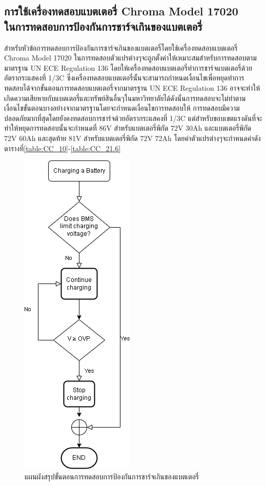\subsection{การใช้เครื่องทดสอบแบตเตอรี่ Chroma Model 17020 \\ ในการทดสอบการป้องกันการชาร์จเกินของแบตเตอรี่}
สำหรับหัวข้อการทดสอบการป้องกันการชาร์จเกินของแบตเตอรี่โดยใช้เครื่องทดสอบแบตเตอรี่ Chroma Model 17020 ในการทดสอบตัวแปรต่างๆจะถูกตั้งค่าให้เหมาะสมสำหรับการทดสอบตามมาตรฐาน UN ECE Regulation 136 โดยให้เครื่องทดสอบแบตเตอรี่ทำการชาร์จแบตเตอรี่ด้วยอัตรากระแสคงที่ 1/3C ซึ่งเครื่องทดสอบแบตเตอรี่นั้นจะสามารถกำหนดเงื่อนไขเพื่อหยุดทำการทดสอบได้จากขั้นตอนการทดสอบแบตเตอรี่จากมาตรฐาน 
UN ECE Regulation 136 อาจจะทำให้เกิดความเสียหายกับแบตเตอรี่และทรัพย์สินอื่นๆในมหาวิทยาลัยได้ดังนั้นการทดสอบจะไม่ทำตามเงื่อนไขขั้นตอนบางอย่างจากมาตรฐานโดยจะกำหนดเงื่อนไขการทดสอบให้
การทดสอบมีความปลอดภัยมากที่สุดโดยยังคงทดสอบการชาร์จด้วยอัตรากระแสคงที่ 1/3C แต่สำหรับขอบเขตแรงดันที่จะทำให้หยุดการทดสอบนั้นจะกำหนดที่ 86V สำหรับแบตเตอรี่พิกัด 72V 30Ah และแบตเตอรี่พิกัด 72V 60Ah และสุดท้าย 81V สำหรับแบตเตอรี่พิกัด 72V 72Ah โดยค่าตัวแปรต่างๆจะกำหนดค่าดังตารางที่\ref{table:CC_10}-\ref{table:CC_21.6}
\begin{center}
	\begin{figure}[H]
		\includegraphics[width=0.25\linewidth]{Chapters/img/R136_DEMO/Charging_flow_chart.png}
		\centering
		\captionsetup{justification=centering,margin=2cm}
		\caption{แผนผังสรุปขั้นตอนการทดสอบการป้องกันการชาร์จเกินของแบตเตอรี่}
	\end{figure}
\end{center}
